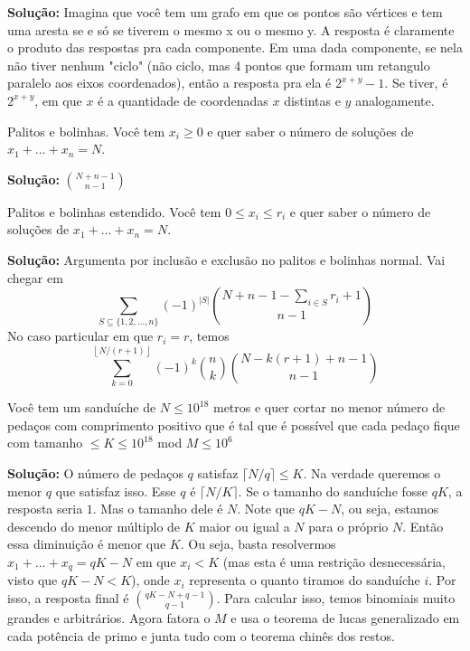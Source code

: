 \textbf{Solução:} Imagina que você tem um grafo em que os pontos são vértices e tem uma aresta se e só se tiverem o mesmo x ou o mesmo y. A resposta é claramente o produto das respostas pra cada componente. Em uma dada componente, se nela não tiver nenhum "ciclo" (não ciclo, mas 4 pontos que formam um retangulo paralelo aos eixos coordenados), então a resposta pra ela é $2^{x+y}-1$. Se tiver, é $2^{x+y}$, em que $x$ é a quantidade de coordenadas $x$ distintas e $y$ analogamente.

 Palitos e bolinhas. Você tem $x_i \geq 0$ e quer saber o número de soluções de $x_1 + \dots + x_n = N$.

\textbf{Solução:} ${N + n - 1 \choose n-1}$

 Palitos e bolinhas estendido. Você tem $0 \leq x_i \leq r_i$ e quer saber o número de soluções de $x_1 + \dots + x_n = N$.

\textbf{Solução:} Argumenta por inclusão e exclusão no palitos e bolinhas normal. Vai chegar em
$$ \sum\limits_{S \subseteq \{1,2, \dots,n \}} (-1)^{|S|} {N + n - 1 - \sum\limits_{i \in S} r_i + 1 \choose n-1}$$
No caso particular em que $r_i = r$, temos
$$ \sum\limits_{k=0}^{\left\lfloor N/(r+1) \right\rfloor} (-1)^k {n \choose k} {N - k (r+1) + n - 1 \choose n -1}$$

 Você tem um sanduíche de $N \leq 10^{18}$ metros e quer cortar no menor número de pedaços com comprimento positivo que é tal que é possível que cada pedaço fique com tamanho $\leq K \leq 10^{18}$ mod $M \leq 10^6$

\textbf{Solução:} O número de pedaços $q$ satisfaz $\lceil N/q \rceil \leq K$. Na verdade queremos o menor $q$ que satisfaz isso. Esse $q$ é $\lceil N / K \rceil$. Se o tamanho do sanduíche fosse $qK$, a resposta seria $1$. Mas o tamanho dele é $N$. Note que $qK - N $, ou seja, estamos descendo do menor múltiplo de $K$ maior ou igual a $N$ para o próprio $N$. Então essa diminuição é menor que $K$. Ou seja, basta resolvermos $x_1 + \dots + x_q = qK - N$ em que $x_i < K$ (mas esta é uma restrição desnecessária, visto que $qK - N < K$), onde $x_i$ representa o quanto tiramos do sanduíche $i$. Por isso, a resposta final é ${qK - N + q - 1 \choose q - 1}$. Para calcular isso, temos binomiais muito grandes e arbitrários. Agora fatora o $M$ e usa o teorema de lucas generalizado em cada potência de primo e junta tudo com o teorema chinês dos restos.